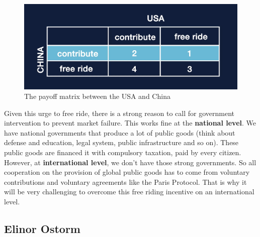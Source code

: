 \documentclass[../summary.tex]{subfiles}
\begin{document}
	  \begin{figure}[htbp]
	  	\centering
	  	\includegraphics[width=1\linewidth]{images/10-payoff-matrix.png}
	  	\caption{The payoff matrix between the USA and China}
	  	\label{fig:payoff-matrix}
	  \end{figure}
	  
	  Given this urge to free ride, there is a strong reason to call for government intervention to prevent market failure. This works fine at the \textbf{national level}. We have national governments that produce a lot of public goods (think about defense and education, legal system, public infrastructure and so on). These public goods are financed it with compulsory taxation, paid by every citizen. However, at \textbf{international level}, we don't have those strong governments. So all cooperation on the provision of global public goods has to come from voluntary contributions and voluntary agreements like the Paris Protocol. That is why it will be very challenging to overcome this free riding incentive on an international level.
	  
	  \subsection{Elinor Ostorm}
	  
\end{document}
